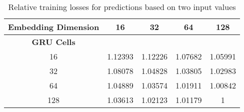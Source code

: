   \begin{table}[htpb]
    \centering
    \label{tab:double}
    \begin{tabular}{| c | c | c | c | c |}
      \hline \textbf{Embedding Dimension}  & 16  & 32  & 64 & 128 \\ \hline
      \textbf{GRU Cells} &  & & & \\
16  &\cellcolor[rgb]{0.9,0.6,0} 1.12393 &\cellcolor[rgb]{0.85,0.65,0} 1.12226 & \cellcolor[rgb]{0.8,0.7,0} 1.07682 & \cellcolor[rgb]{0.75,0.7,0} 1.05991 \\ \hline
32  &\cellcolor[rgb]{0.8,0.65,0} 1.08078 & \cellcolor[rgb]{0.7,0.75,0} 1.04828 & \cellcolor[rgb]{0.7,0.8,0} 1.03805 &  \cellcolor[rgb]{0.6,0.85,0}1.02983 \\ \hline
64  & \cellcolor[rgb]{0.75,0.75,0} 1.04889 & \cellcolor[rgb]{0.65,0.85,0} 1.03574 & \cellcolor[rgb]{0.55,0.9,0} 1.01911 & \cellcolor[rgb]{0.5,0.95,0} 1.00842 \\ \hline
      128 & \cellcolor[rgb]{0.65,0.8,0} 1.03613 & \cellcolor[rgb]{0.6,0.9,0} 1.02123 & \cellcolor[rgb]{0.55,0.95,0} 1.01179 & \cellcolor[rgb]{0.5,1.0,0} 1 \\ \hline

    \end{tabular}
    \caption{Relative training losses for predictions based on two input values}
  \end{table}
